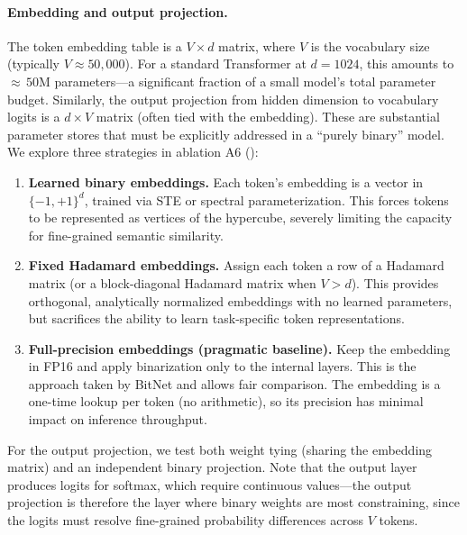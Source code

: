 \documentclass[12pt,a4paper]{article}
\theoremstyle{plain}
\theoremstyle{definition}
\theoremstyle{remark}
\newcommand{\pmone}{\{-1,+1\}}
\begin{document}
\paragraph{Embedding and output projection.}
The token embedding table is a $V \times d$ matrix, where $V$ is the vocabulary size (typically $V \approx 50{,}000$).
For a standard Transformer at $d = 1024$, this amounts to ${\approx}\,50$M parameters---a significant fraction of a small model's total parameter budget.
Similarly, the output projection from hidden dimension to vocabulary logits is a $d \times V$ matrix (often tied with the embedding).
These are substantial parameter stores that must be explicitly addressed in a ``purely binary'' model.
We explore three strategies in ablation A6 ():
\begin{enumerate}[label=(\roman*)]
  \item \textbf{Learned binary embeddings.} Each token's embedding is a vector in $\pmone^d$, trained via STE or spectral parameterization. This forces tokens to be represented as vertices of the hypercube, severely limiting the capacity for fine-grained semantic similarity.
  \item \textbf{Fixed Hadamard embeddings.} Assign each token a row of a Hadamard matrix (or a block-diagonal Hadamard matrix when $V > d$). This provides orthogonal, analytically normalized embeddings with no learned parameters, but sacrifices the ability to learn task-specific token representations.
  \item \textbf{Full-precision embeddings (pragmatic baseline).} Keep the embedding in FP16 and apply binarization only to the internal layers. This is the approach taken by BitNet and allows fair comparison. The embedding is a one-time lookup per token (no arithmetic), so its precision has minimal impact on inference throughput.
\end{enumerate}
For the output projection, we test both weight tying (sharing the embedding matrix) and an independent binary projection.
Note that the output layer produces logits for softmax, which require continuous values---the output projection is therefore the layer where binary weights are most constraining, since the logits must resolve fine-grained probability differences across $V$ tokens.
\end{document}
